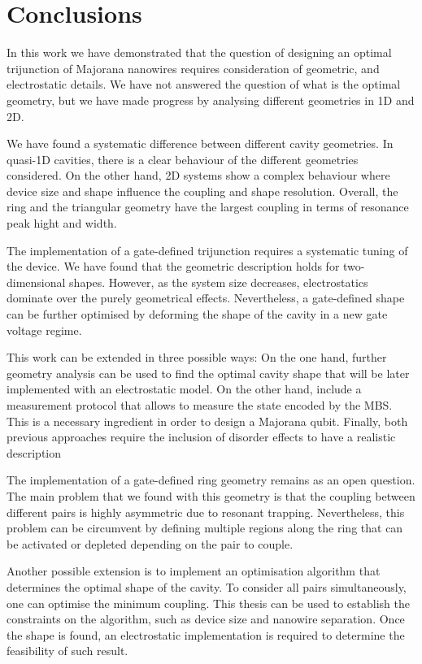 \chapter{Conclusions}

In this work we have demonstrated that the question of designing an optimal trijunction of Majorana nanowires requires consideration of geometric, and electrostatic details.
We have not answered the question of what is the optimal geometry, but we have made progress by analysing different geometries in 1D and 2D.

We have found a systematic difference between different cavity geometries.
In quasi-1D cavities, there is a clear behaviour of the different geometries considered.
On the other hand, 2D systems show a complex behaviour where device size and shape influence the coupling and shape resolution.
Overall, the ring and the triangular geometry have the largest coupling in terms of resonance peak hight and width.

The implementation of a gate-defined trijunction requires a systematic tuning of the device.
We have found that the geometric description holds for two-dimensional shapes.
However, as the system size decreases, electrostatics dominate over the purely geometrical effects.
Nevertheless, a gate-defined shape can be further optimised by deforming the shape of the cavity in a new gate voltage regime.

This work can be extended in three possible ways:
On the one hand, further geometry analysis can be used to find the optimal cavity shape that will be later implemented with an electrostatic model.
On the other hand, include a measurement protocol that allows to measure the state encoded by the MBS.
This is a necessary ingredient in order to design a Majorana qubit.
Finally, both previous approaches require the inclusion of disorder effects to have a realistic description

The implementation of a gate-defined ring geometry remains as an open question.
The main problem that we found with this geometry is that the coupling between different pairs is highly asymmetric due to resonant trapping.
Nevertheless, this problem can be circumvent by defining multiple regions along the ring that can be activated or depleted depending on the pair to couple.

Another possible extension is to implement an optimisation algorithm that determines the optimal shape of the cavity.
To consider all pairs simultaneously, one can optimise the minimum coupling.
This thesis can be used to establish the constraints on the algorithm, such as device size and nanowire separation.
Once the shape is found, an electrostatic implementation is required to determine the feasibility of such result.